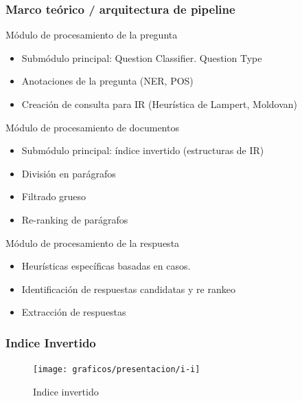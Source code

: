 \fontsize{8.5pt}{7.2}\selectfont
\begin{frame}[<+->]
\frametitle{Marco teórico / arquitectura de pipeline}
  \begin{block}{Módulo de procesamiento de la pregunta}
    \begin{itemize}
      \item Submódulo principal: Question Classifier. Question Type
      \item Anotaciones de la pregunta (NER, POS)
      \item Creación de consulta para IR (Heurística de Lampert, Moldovan)
    \end{itemize}
  \end{block}
  \begin{alertblock}{Módulo de procesamiento de documentos}
    \begin{itemize}
      \item Submódulo principal: índice invertido (estructuras de IR)
      \item División en parágrafos
      \item Filtrado grueso
      \item Re-ranking de parágrafos
    \end{itemize}
  \end{alertblock}
  
  \begin{exampleblock}{Módulo de procesamiento de la respuesta}
    \begin{itemize}
      \item Heurísticas específicas basadas en casos.
      \item Identificación de respuestas candidatas y re rankeo
      \item Extracción de respuestas
    \end{itemize}
  \end{exampleblock}
\end{frame}


\begin{frame}
\frametitle{Indice Invertido}
  \begin{figure}
      \texttt{[image: graficos/presentacion/i-i]}
    \caption{Indice invertido}
    \label{fig:tareas}
  \end{figure}
\end{frame}



